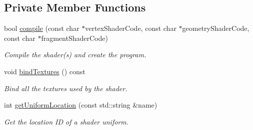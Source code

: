 \subsection*{Private Member Functions}
\begin{DoxyCompactItemize}
\item 
bool \mbox{\hyperlink{classsf_1_1_shader_ae83560b673e726e48fc032f62584d606}{compile}} (const char $\ast$vertex\+Shader\+Code, const char $\ast$geometry\+Shader\+Code, const char $\ast$fragment\+Shader\+Code)
\begin{DoxyCompactList}\small\item\em Compile the shader(s) and create the program. \end{DoxyCompactList}\item 
void \mbox{\hyperlink{classsf_1_1_shader_a091595f44919468606a36e3414b5106e}{bind\+Textures}} () const
\begin{DoxyCompactList}\small\item\em Bind all the textures used by the shader. \end{DoxyCompactList}\item 
int \mbox{\hyperlink{classsf_1_1_shader_a2127d2ac6030a825cdcb5605791d3d8a}{get\+Uniform\+Location}} (const std\+::string \&name)
\begin{DoxyCompactList}\small\item\em Get the location ID of a shader uniform. \end{DoxyCompactList}\end{DoxyCompactItemize}
